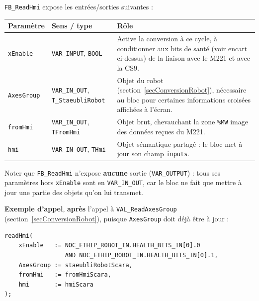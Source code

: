 \texttt{FB\_ReadHmi} expose les entrées/sorties suivantes :

\begin{center}
\begin{tabular}{|l|l|p{7.3cm}|}
\hline
\textbf{Paramètre} & \textbf{Sens / type} & \textbf{Rôle} \\
\hline
\texttt{xEnable} & \texttt{VAR\_INPUT}, \texttt{BOOL} & Active la
conversion à ce cycle, à conditionner aux bits de santé (voir encart
ci-dessus) de la liaison avec le M221 et avec la CS9. \\
\hline
\texttt{AxesGroup} & \texttt{VAR\_IN\_OUT}, \texttt{T\_StaeubliRobot} &
Objet du robot (section~\ref{secConversionRobot}), nécessaire au bloc
pour certaines informations croisées affichées à l'écran. \\
\hline
\texttt{fromHmi} & \texttt{VAR\_IN\_OUT}, \texttt{TFromHmi} & Objet brut,
chevauchant la zone \texttt{\%MW} image des données reçues du M221. \\
\hline
\texttt{hmi} & \texttt{VAR\_IN\_OUT}, \texttt{THmi} & Objet sémantique
partagé : le bloc met à jour son champ \texttt{inputs}. \\
\hline
\end{tabular}
\end{center}

Noter que \texttt{FB\_ReadHmi} n'expose \textbf{aucune} sortie
(\texttt{VAR\_OUTPUT}) : tous ses paramètres hors \texttt{xEnable} sont en
\texttt{VAR\_IN\_OUT}, car le bloc ne fait que mettre à jour une partie
des objets qu'on lui transmet.

\textbf{Exemple d'appel}, \textbf{après} l'appel à
\texttt{VAL\_ReadAxesGroup} (section~\ref{secConversionRobot}), puisque
\texttt{AxesGroup} doit déjà être à jour :

\begin{lstlisting}
readHmi(
    xEnable   := NOC_ETHIP_ROBOT_IN.HEALTH_BITS_IN[0].0
                 AND NOC_ETHIP_ROBOT_IN.HEALTH_BITS_IN[0].1,
    AxesGroup := staeubliRobotScara,
    fromHmi   := fromHmiScara,
    hmi       := hmiScara
);
\end{lstlisting}

